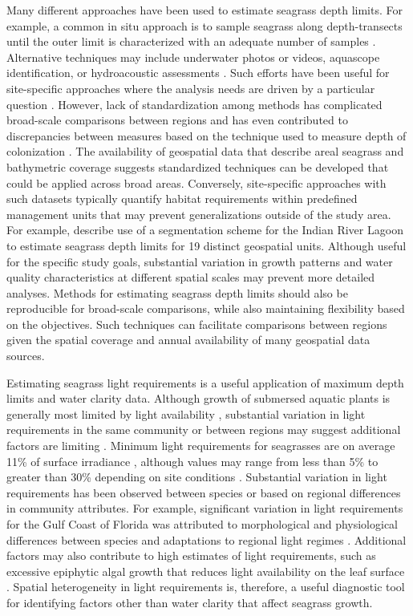 \documentclass[letterpaper,12pt,oneside]{article}\usepackage[]{graphicx}\usepackage[]{color}
\begin{document}
Many different approaches have been used to estimate seagrass depth limits.  For example, a common in situ approach is to sample seagrass along depth-transects until the outer limit is characterized with an adequate number of samples \citep[e.g.,][]{Spears09}.  Alternative techniques may include underwater photos or videos, aquascope identification, or hydroacoustic assessments \citep{Zhu07,Sondergaard13}.  Such efforts have been useful for site-specific approaches where the analysis needs are driven by a particular question \citep[e.g.,][]{Iverson86,Hale04}. However, lack of standardization among methods has complicated broad-scale comparisons between regions and has even contributed to discrepancies between measures based on the technique used to measure depth of colonization \citep{Spears09}.  The availability of geospatial data that describe areal seagrass and bathymetric coverage suggests standardized techniques can be developed that could be applied across broad areas.  Conversely, site-specific approaches with such datasets typically quantify habitat requirements within predefined management units that may prevent generalizations outside of the study area. For example, \cite{Steward05} describe use of a segmentation scheme for the Indian River Lagoon to estimate seagrass depth limits for 19 distinct geospatial units.  Although useful for the specific study goals, substantial variation in growth patterns and water quality characteristics at different spatial scales may prevent more detailed analyses.  Methods for estimating seagrass depth limits should also be reproducible for broad-scale comparisons, while also maintaining flexibility based on the objectives. Such techniques can facilitate comparisons between regions given the spatial coverage and annual availability of many geospatial data sources.  

Estimating seagrass light requirements is a useful application of maximum depth limits and water clarity data.  Although growth of submersed aquatic plants is generally most limited by light availability \citep{Barko82,Hall90,Dennison93}, substantial variation in light requirements in the same community or between regions may suggest additional factors are limiting \citep{Dennison93,Choice14}.  Minimum light requirements for seagrasses are on average 11\% of surface irradiance \citep{Duarte91}, although values may range from less than 5\% to greater than 30\% depending on site conditions \citep{Dennison93}. Substantial variation in light requirements has been observed between species or based on regional differences in community attributes.  For example, significant variation in light requirements for the Gulf Coast of Florida was attributed to morphological and physiological differences between species and adaptations to regional light regimes \citep{Choice14}. Additional factors may also contribute to high estimates of light requirements, such as excessive epiphytic algal growth that reduces light availability on the leaf surface \citep{Kemp04}. Spatial heterogeneity in light requirements is, therefore, a useful diagnostic tool for identifying factors other than water clarity that affect seagrass growth. 
\end{document}
